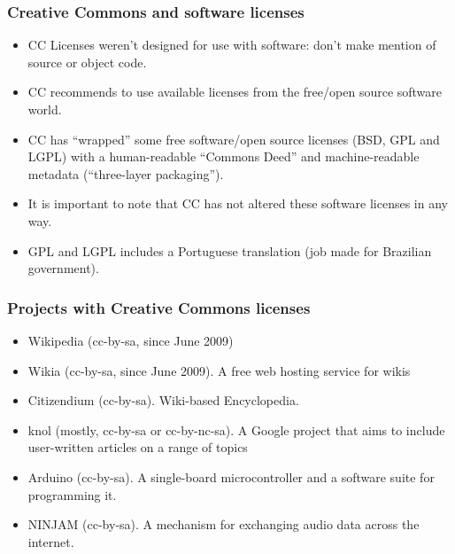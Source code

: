 \documentclass{beamer}
\begin{document}
\begin{frame}
\frametitle{Creative Commons and software licenses}

\begin{itemize}
\item CC Licenses weren't designed for use with software: don't make mention of source or object code.
\item CC recommends to use available licenses from the free/open source software world.
\item CC has ``wrapped'' some free software/open source licenses (BSD, GPL and LGPL) with a human-readable ``Commons Deed'' and machine-readable metadata (``three-layer packaging'').
\item It is important to note that CC has not altered these software licenses in any way.
\item GPL and LGPL includes a Portuguese translation (job made for Brazilian government).
\end{itemize}                                                 

\end{frame}


\begin{frame}
\frametitle{Projects with Creative Commons licenses}

\begin{itemize}
\item \alert{Wikipedia} (cc-by-sa, since June 2009)
\item \alert{Wikia} (cc-by-sa, since June 2009). A free web hosting service for wikis
\item \alert{Citizendium} (cc-by-sa). Wiki-based Encyclopedia.
\item \alert{knol} (mostly, cc-by-sa or cc-by-nc-sa). A Google project that aims to include user-written articles on a range of topics
\item \alert{Arduino} (cc-by-sa). A single-board microcontroller and a software suite for programming it. 
\item \alert{NINJAM} (cc-by-sa). A mechanism for exchanging audio data across the internet.
\end{itemize}                                                 

\end{frame}

\end{document}
